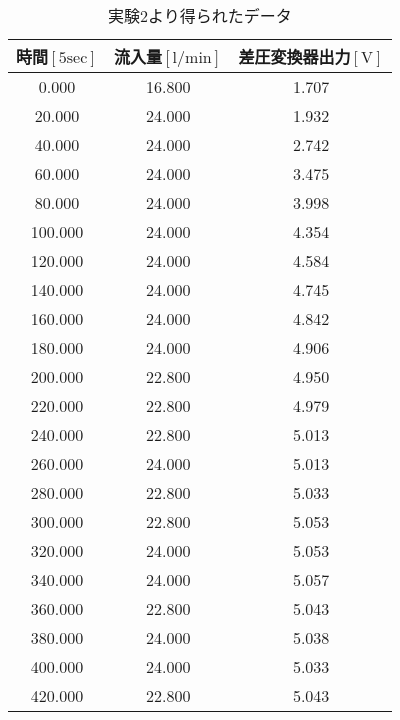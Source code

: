 \begin{table}[b]
  \begin{center}
    \caption{実験2より得られたデータ}
    \begin{tabular}{|c|c|c|} \hline
      時間$\mathrm{[5sec]}$ & 流入量$\mathrm{[l/min]}$ & 差圧変換器出力$\mathrm{[V]}$ \\ \hline \hline
      0.000   & 16.800   & 1.707 \\ \hline
      20.000  & 24.000   & 1.932 \\ \hline
      40.000  & 24.000   & 2.742 \\ \hline
      60.000  & 24.000   & 3.475 \\ \hline
      80.000  & 24.000   & 3.998 \\ \hline
      100.000	& 24.000   & 4.354 \\ \hline
      120.000	& 24.000   & 4.584 \\ \hline
      140.000	& 24.000   & 4.745 \\ \hline
      160.000	& 24.000   & 4.842 \\ \hline
      180.000	& 24.000   & 4.906 \\ \hline
      200.000	& 22.800   & 4.950 \\ \hline
      220.000	& 22.800   & 4.979 \\ \hline
      240.000	& 22.800   & 5.013 \\ \hline
      260.000	& 24.000   & 5.013 \\ \hline
      280.000	& 22.800   & 5.033 \\ \hline
      300.000	& 22.800   & 5.053 \\ \hline
      320.000	& 24.000   & 5.053 \\ \hline
      340.000	& 24.000   & 5.057 \\ \hline
      360.000	& 22.800   & 5.043 \\ \hline
      380.000	& 24.000   & 5.038 \\ \hline
      400.000	& 24.000   & 5.033 \\ \hline
      420.000	& 22.800   & 5.043 \\ \hline
    \end{tabular}
    \label{tab:data2}
  \end{center}
\end{table}
